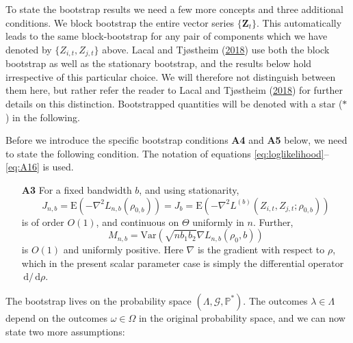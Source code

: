 \documentclass[
  12pt,
  letterpaper]{article}
\numberwithin{equation}{section}
\newcommand{\Z}{\bm{Z}}
\newcommand{\E}{\textrm{E}}
\newcommand{\Var}{\textrm{Var}}
\newcommand{\di}{\,\textrm{d}}
\begin{document}
To state the bootstrap results we need a few more concepts and three additional conditions. We block bootstrap the entire vector series \(\{\Z_t\}\). This automatically leads to the same block-bootstrap for any pair of components which we have denoted by \(\{Z_{i,t}, Z_{j,t}\}\) above. Lacal and Tjøstheim (\protect\hyperlink{ref-lacal2018estimating}{2018}) use both the block bootstrap as well as the stationary bootstrap, and the results below hold irrespective of this particular choice. We will therefore not distinguish between them here, but rather refer the reader to Lacal and Tjøstheim (\protect\hyperlink{ref-lacal2018estimating}{2018}) for further details on this distinction. Bootstrapped quantities will be denoted with a star (\(*\)) in the following.

Before we introduce the specific bootstrap conditions \textbf{A4} and \textbf{A5} below, we need to state the following condition. The notation of equations \eqref{eq:loglikelihood}--\eqref{eq:A16} is used.

\begin{itemize}
\item[\textbf{A3}] For a fixed bandwidth $b$, and using stationarity,
$$J_{n,b} = \E\left(-\nabla^2L_{n,b}(\rho_{0,b})\right) = J_b = \E\left(-\nabla^2 L^{(b)}(Z_{i,t}, Z_{j,t};\rho_{0,b})\right)$$
is of order $O(1)$, and continuous on $\Theta$ uniformly in $n$. Further,
$$M_{n,b} = \Var\left(\sqrt{nb_1b_2}\nabla L_{n,b}(\rho_0,b)\right)$$
is $O(1)$ and uniformly positive. Here $\nabla$ is the gradient with respect to $\rho$, which in the present scalar parameter case is simply the differential operator $\di/\di\rho$.
\end{itemize}

The bootstrap lives on the probability space \((\Lambda, \mathcal{G}, \mathbb{P}^*)\). The outcomes \(\lambda \in \Lambda\) depend on the outcomes \(\omega \in \Omega\) in the original probability space, and we can now state two more assumptions:
\end{document}
